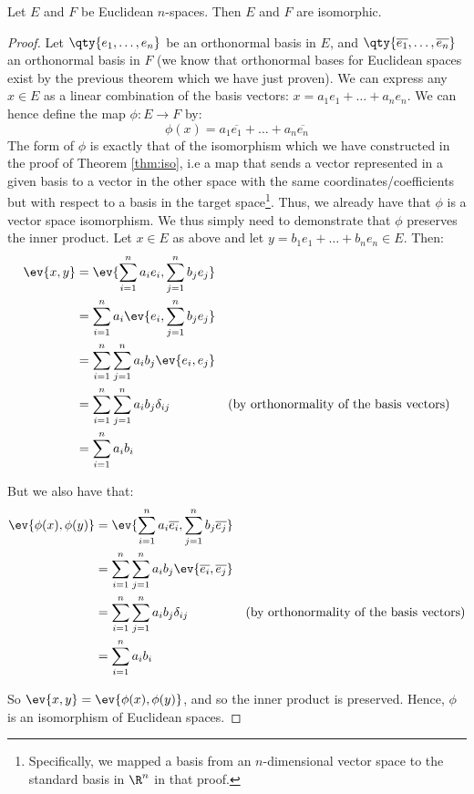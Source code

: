 \begin{theorem}
  Let \( E \) and \( F \) be Euclidean \( n \)-spaces. Then \( E \) and \( F \) are isomorphic.
\end{theorem}
\begin{proof}
  Let \( \qty{e_1,\dots,e_n} \) be an orthonormal basis in \( E \), and \( \qty{\overline{e_1},\dots,\overline{e_n}} \) an orthonormal basis in \( F \) (we know that orthonormal bases for Euclidean spaces exist by the previous theorem which we have just proven). We can express any \( x\in E \) as a linear combination of the basis vectors: \( x=a_1e_1+\dots+a_ne_n \). We can hence define the map \( \phi:E\to F \) by:
  \[ \phi(x)=a_1\overline{e_1}+\dots+a_n\overline{e_n} \]
  The form of \( \phi \) is exactly that of the isomorphism which we have constructed in the proof of Theorem \ref{thm:iso}, i.e a map that sends a vector represented in a given basis to a vector in the other space with the same coordinates/coefficients but with respect to a basis in the target space\footnote{Specifically, we mapped a basis from an \( n \)-dimensional vector space to the standard basis in \( \R^n \) in that proof.}. Thus, we already have that \( \phi \) is a vector space isomorphism. We thus simply need to demonstrate that \( \phi \) preserves the inner product. Let \( x\in E \) as above and let \( y=b_1e_1+\dots+b_ne_n\in E \). Then:
  \begin{align*}
    \ev{x,y}&= \ev{\sum_{i=1}^na_ie_i,\sum_{j=1}^nb_je_j}\\
    &= \sum_{i=1}^na_i\ev{e_i,\sum_{j=1}^nb_je_j}\\
    &= \sum_{i=1}^n\sum_{j=1}^na_ib_j\ev{e_i,e_j}\\
    &= \sum_{i=1}^n\sum_{j=1}^na_ib_j\delta_{ij}&(\text{by orthonormality of the basis vectors})\\
    &= \sum_{i=1}^na_ib_i
  \end{align*}

  But we also have that:
  \begin{align*}
    \ev{\phi(x),\phi(y)}&= \ev{\sum_{i=1}^na_i\overline{e_i},\sum_{j=1}^nb_j\overline{e_j}}\\
    &= \sum_{i=1}^n\sum_{j=1}^na_ib_j\ev{\overline{e_i},\overline{e_j}}\\
    &= \sum_{i=1}^n\sum_{j=1}^na_ib_j\delta_{ij}&(\text{by orthonormality of the basis vectors})\\
    &= \sum_{i=1}^na_ib_i
  \end{align*}

  So \( \ev{x,y}=\ev{\phi(x),\phi(y)} \), and so the inner product is preserved. Hence, \( \phi \) is an isomorphism of Euclidean spaces.
\end{proof}

